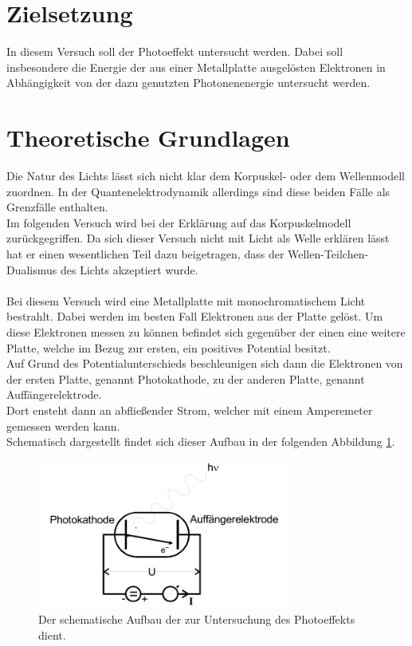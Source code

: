 \section{Zielsetzung}
    \noindent In diesem Versuch soll der Photoeffekt untersucht werden. 
    Dabei soll insbesondere die Energie der aus einer Metallplatte ausgelösten Elektronen in Abhängigkeit von der dazu genutzten Photonenenergie untersucht werden.\\



\section{Theoretische Grundlagen}


    \noindent  Die Natur des Lichts lässt sich nicht klar dem Korpuskel- oder dem Wellenmodell zuordnen. 
    In der Quantenelektrodynamik allerdings sind diese beiden Fälle als Grenzfälle enthalten.\\
    Im folgenden Versuch wird bei der Erklärung auf das Korpuskelmodell zurückgegriffen.
    Da sich dieser Versuch nicht mit Licht als Welle erklären lässt hat er einen wesentlichen Teil dazu beigetragen, dass der Wellen-Teilchen-Dualismus des Lichts akzeptiert wurde.\\\\
    \noindent Bei diesem Versuch wird eine Metallplatte mit monochromatischem Licht bestrahlt. Dabei werden im besten Fall Elektronen aus der Platte gelöst.
    Um diese Elektronen messen zu können befindet sich gegenüber der einen eine weitere Platte, welche im Bezug zur ersten, ein positives Potential besitzt.\\
    Auf Grund des Potentialunterschieds beschleunigen sich dann die Elektronen von der ersten Platte, genannt Photokathode, zu der anderen Platte, genannt Auffängerelektrode.\\
    Dort ensteht dann an abfließender Strom, welcher mit einem Amperemeter gemessen werden kann.\\
    \noindent Schematisch dargestellt findet sich dieser Aufbau in der folgenden Abbildung \ref{img:schem}. 

    \begin{figure}[H]
        \centering
        \includegraphics[width=0.75\textwidth]{latex/images/Schaltkreis.PNG}
        \caption{Der schematische Aufbau der zur Untersuchung des Photoeffekts dient\protect \cite{500}.}
        \label{img:schem}
    \end{figure}

